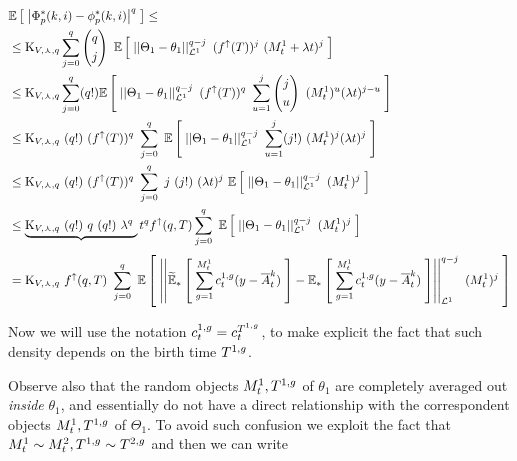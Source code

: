 	\begin{align*}
		&\mathbb{E} \left[ \; 
			\left| 
				\Phi_p^\ast(k,i) - \phi_p^\ast(k,i)
			 \right|^q
		 \; \right]\leq
		\\
		&\leq
		\text{K}_{V,\curlywedge,q}
		\sum_{j=0}^{q}
		\left(
		\begin{gathered}
			q
			\\
			j
		\end{gathered}
		\right)\
		\mathbb{E} \left[ \; 
			\left|\left| 
				\Theta_1 - \theta_1
			 \right|\right|_{\mathcal{L}^1}^{q-j}\
			(f^\uparrow(T))^j\
			(M_t^1 + \lambda t)^{j}
		 \; \right]
		\\
		&\leq
		\text{K}_{V,\curlywedge,q}
		\sum_{j=0}^{q}
		(q!)
		\mathbb{E} \left[ \; 
			\left|\left| 
				\Theta_1 - \theta_1
			 \right|\right|_{\mathcal{L}^1}^{q-j}\
			(f^\uparrow(T))^q\
			\sum_{u=1}^j
			\left(
			\begin{gathered}
				j
				\\
				u
			\end{gathered}
			\right)\
			(M_t^1)^u (\lambda t)^{j-u}
		 \; \right]
		\\
		&\leq
		\text{K}_{V,\curlywedge,q}\
		(q!)\
		(f^\uparrow(T))^q\
		\sum_{j=0}^{q}\
		\mathbb{E} \left[ \; 
			\left|\left| 
				\Theta_1 - \theta_1
			 \right|\right|_{\mathcal{L}^1}^{q-j}\
			\sum_{u=1}^j
			(j!)\
			(M_t^1)^j (\lambda t)^j
		 \; \right]
		\\
		&\leq
		\text{K}_{V,\curlywedge,q}\
		(q!)\
		(f^\uparrow(T))^q\
		\sum_{j=0}^{q}\
		j\
		(j!)\
		(\lambda t)^j\
		\mathbb{E} \left[ \; 
			\left|\left| 
				\Theta_1 - \theta_1
			 \right|\right|_{\mathcal{L}^1}^{q-j}\
			(M_t^1)^j 
		 \; \right]
		\\
		&\leq
		\underbrace{
			\text{K}_{V,\curlywedge,q}\
			(q!)\
			q\
			(q!)\
			\lambda^q\
		}_{}
		t^q
		f^\uparrow(q,T)
		\sum_{j=0}^{q}\
		\mathbb{E} \left[ \; 
			\left|\left| 
				\Theta_1 - \theta_1
			 \right|\right|_{\mathcal{L}^1}^{q-j}\
			(M_t^1)^j 
		 \; \right]
		\\
		&=
		\text{K}_{V,\curlywedge,q}\
		f^\uparrow(q,T)\
		\sum_{j=0}^{q}\
		\mathbb{E} \left[ \; 
			\left|\left| 
				\widetilde{\mathbb{E}}_{\ast} \left[ \; 
					\sum _{g = 1}^{M_t^1}
					c_t^{1,g}
					(y - \overline{A}_t^k)
				 \; \right]
				-
				\mathbb{E}_{\ast} \left[ \; 
					\sum _{g = 1}^{M_t^1}
					c_t^{1,g}
					(y - \overline{A}_t^k)
				 \; \right]
			 \right|\right|_{\mathcal{L}^1}^{q-j}\
			(M_t^1)^j 
		 \; \right]  
	\end{align*}
	
	Now we will use the notation $c_t^{1,g} = c_t^{T^{1,g}}$, to make explicit the fact that such density depends on the birth time $T^{1,g}$.
	
	Observe also that the random objects $M_t^1, T^{1,g}$ of $\theta_1$ are completely averaged out \emph{inside} $\theta_1$, and essentially do not have a direct relationship with the correspondent objects $M_t^1, T^{1,g}$ of $\Theta_1$.
	To avoid such confusion we exploit the fact that $M_t^1 \sim M_t^2, T^{1,g} \sim T^{2,g}$ and then we can write
	
